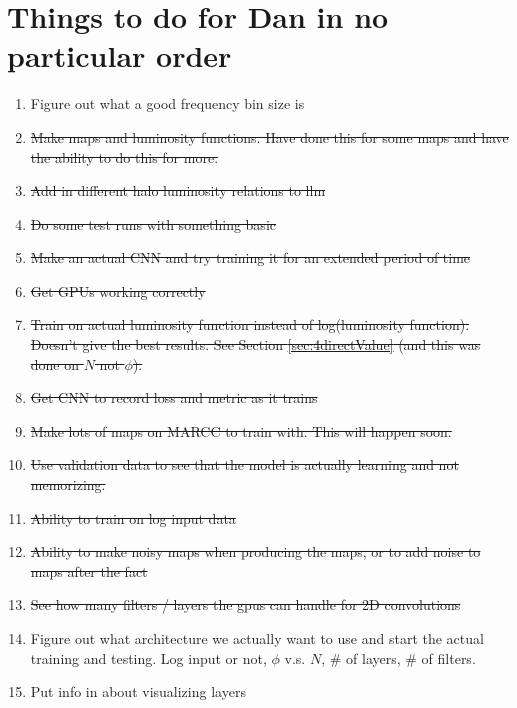 \documentclass{article}
\begin{document}
	\section{Things to do for Dan in no particular order} \label{sec:todo}
		\begin{enumerate}
			\item Figure out what a good frequency bin size is

			\item \sout{Make maps and luminosity functions. Have done this for some maps and have the ability to do this for more.}

			\item \sout{Add in different halo luminosity relations to llm}

			\item \sout{Do some test runs with something basic}

			\item \sout{Make an actual CNN and try training it for an extended period of time}

			\item \sout{Get GPUs working correctly}

			\item \sout{Train on actual luminosity function instead of log(luminosity function). Doesn't give the best results.  See Section \ref{sec:4directValue} (and this was done on \(N\) not \(\phi\)).}

			\item \sout{Get CNN to record loss and metric as it trains}

			\item \sout{Make lots of maps on MARCC to train with.  This will happen soon.}

			\item \sout{Use validation data to see that the model is actually learning and not memorizing.}

			\item \sout{Ability to train on log input data}

			\item \sout{Ability to make noisy maps when producing the maps, or to add noise to maps after the fact}

			\item \sout{See how many filters / layers the gpus can handle for 2D convolutions}

			\item Figure out what architecture we actually want to use and start the actual training and testing.  Log input or not, \(\phi\) v.s. \(N\), \# of layers, \# of filters.

			\item Put info in about visualizing layers
		\end{enumerate}


	
% 
\end{document}
